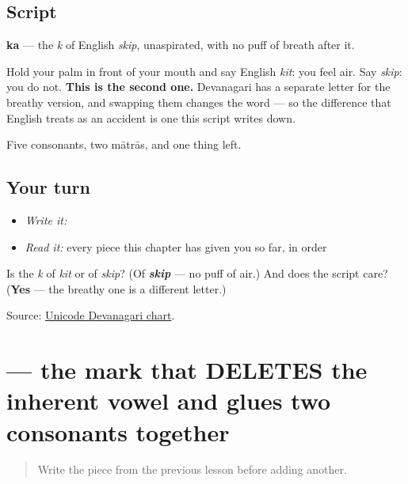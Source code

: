 \subsection*{Script}

\begin{quote}
\end{quote}

\textbf{ka} — the \emph{k} of English \emph{skip}, unaspirated, with no puff of breath after it.

Hold your palm in front of your mouth and say English \emph{kit}: you feel air. Say \emph{skip}: you do not. \textbf{This is the second one.} Devanagari has a separate letter for the breathy version, and swapping them changes the word — so the difference that English treats as an accident is one this script writes down.

Five consonants, two mātrās, and one thing left.

\subsection*{Your turn}
\begin{itemize}
\raggedright
  \item \emph{Write it:} 
  \item \emph{Read it:} every piece this chapter has given you so far, in order
\end{itemize}

\begin{tcolorbox}[breakable,colback=teal!4,colframe=teal!35!black,title={Before you move on}]
Is \textbf{} the \emph{k} of \emph{kit} or of \emph{skip}? (Of \emph{\textbf{skip}} — no puff of air.) And does the script care? (\textbf{Yes} — the breathy one is a different letter.)

Source: \href{https://www.unicode.org/charts/PDF/U0900.pdf}{Unicode Devanagari chart}.
\end{tcolorbox}
\section[\texorpdfstring{\mr{्} ((virama))}{् ((virama))}]{ — the mark that DELETES the inherent vowel and glues two consonants together}

\label{lesson:MR-W01-virama}



\begin{quote}
Write the piece from the previous lesson before adding another.
\end{quote}

